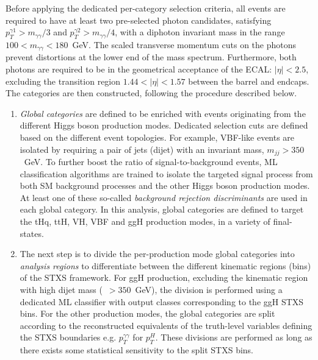 Before applying the dedicated per-category selection criteria, all events are required to have at least two pre-selected photon candidates, satisfying $p_T^{\gamma 1}>m_{\gamma\gamma}/3$ and ${p_T^{\gamma 2}>m_{\gamma\gamma}/4}$, with a diphoton invariant mass in the range $100<m_{\gamma\gamma}<180$~GeV. The scaled transverse momentum cuts on the photons prevent distortions at the lower end of the mass spectrum. Furthermore, both photons are required to be in the geometrical acceptance of the ECAL: $|\eta|<2.5$, excluding the transition region $1.44<|\eta|<1.57$ between the barrel and endcaps. The categories are then constructed, following the procedure described below.

\begin{enumerate}
    \item \textit{Global categories} are defined to be enriched with events originating from the different Higgs boson production modes. Dedicated selection cuts are defined based on the different event topologies. For example, VBF-like events are isolated by requiring a pair of jets (dijet) with an invariant mass, $m_{jj}>350$~GeV. To further boost the ratio of signal-to-background events, ML classification algorithms are trained to isolate the targeted signal process from both SM background processes and the other Higgs boson production modes. At least one of these so-called \textit{background rejection discriminants} are used in each global category. In this analysis, global categories are defined to target the tHq, ttH, VH, VBF and ggH production modes, in a variety of final-states.
    
    \item The next step is to divide the per-production mode global categories into \textit{analysis regions} to differentiate between the different kinematic regions (bins) of the STXS framework. For ggH production, excluding the kinematic region with high dijet mass (\mjj~$>350$~GeV), the division is performed using a dedicated ML classifier with output classes corresponding to the ggH STXS bins. For the other production modes, the global categories are split according to the reconstructed equivalents of the truth-level variables defining the STXS boundaries e.g. $p_T^{\gamma\gamma}$ for $p_T^H$. These divisions are performed as long as there exists some statistical sensitivity to the split STXS bins. 
    

\end{enumerate}
